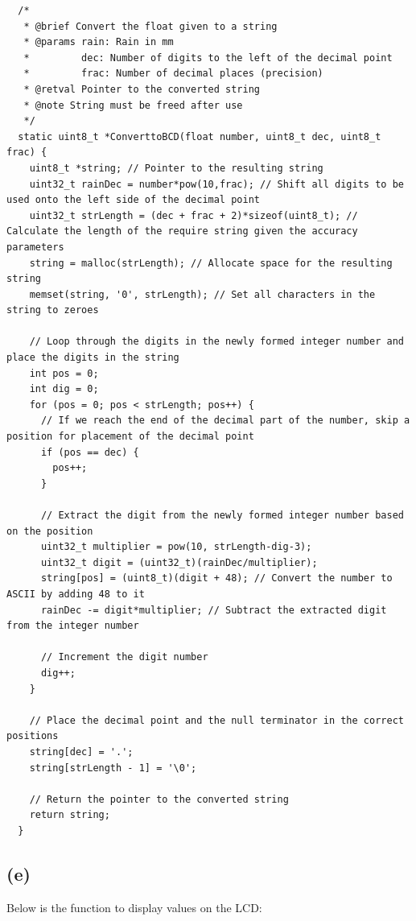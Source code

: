 \begin{verbatim}
  /*
   * @brief Convert the float given to a string
   * @params rain: Rain in mm
   *         dec: Number of digits to the left of the decimal point
   *         frac: Number of decimal places (precision)
   * @retval Pointer to the converted string
   * @note String must be freed after use
   */
  static uint8_t *ConverttoBCD(float number, uint8_t dec, uint8_t frac) {
    uint8_t *string; // Pointer to the resulting string
    uint32_t rainDec = number*pow(10,frac); // Shift all digits to be used onto the left side of the decimal point
    uint32_t strLength = (dec + frac + 2)*sizeof(uint8_t); // Calculate the length of the require string given the accuracy parameters
    string = malloc(strLength); // Allocate space for the resulting string
    memset(string, '0', strLength); // Set all characters in the string to zeroes

    // Loop through the digits in the newly formed integer number and place the digits in the string
    int pos = 0;
    int dig = 0;
    for (pos = 0; pos < strLength; pos++) {
      // If we reach the end of the decimal part of the number, skip a position for placement of the decimal point
      if (pos == dec) {
        pos++;
      }

      // Extract the digit from the newly formed integer number based on the position
      uint32_t multiplier = pow(10, strLength-dig-3);
      uint32_t digit = (uint32_t)(rainDec/multiplier);
      string[pos] = (uint8_t)(digit + 48); // Convert the number to ASCII by adding 48 to it
      rainDec -= digit*multiplier; // Subtract the extracted digit from the integer number

      // Increment the digit number
      dig++;
    }

    // Place the decimal point and the null terminator in the correct positions
    string[dec] = '.';
    string[strLength - 1] = '\0';

    // Return the pointer to the converted string
    return string;
  }
\end{verbatim}
\vspace{0.5cm}

\subsection*{(e)}
\label{sub:(e)}

Below is the function to display values on the LCD:\\

